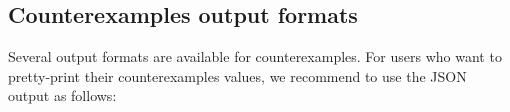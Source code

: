 \subsection{Counterexamples output formats}

Several output formats are available for counterexamples. For users who want to
pretty-print their counterexamples values, we recommend to use the JSON output
as follows:



